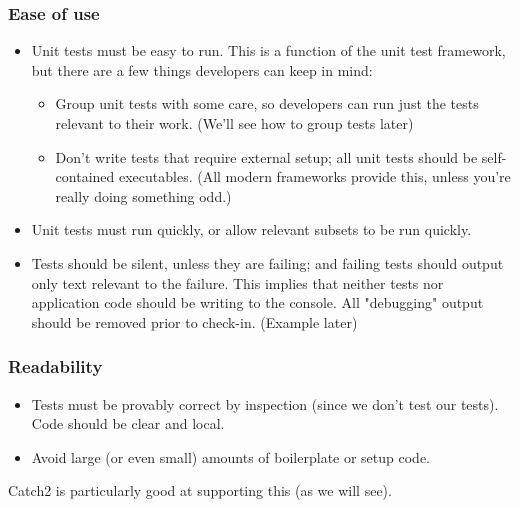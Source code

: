 \begin{frame}[fragile,t]
\frametitle{Ease of use}
\begin{itemize}
\item Unit tests must be easy to run. This is a function of the unit
  test framework, but there are a few things developers can keep in
  mind:
\begin{itemize}
  \item Group unit tests with some care, so developers can run just
    the tests relevant to their work. (We'll see how to group tests
    later)
  \item Don't write tests that require external setup; all unit tests
    should be self-contained executables. (All modern frameworks
    provide this, unless you're really doing something odd.)
\end{itemize}
\item Unit tests must run quickly, or allow relevant subsets to be run quickly.
\item Tests should be silent, unless they are failing; and failing
  tests should output only text relevant to the failure.  This implies
  that neither tests nor application code should be writing to the
  console. All "debugging" output should be removed prior to check-in.
  (Example later)
\end{itemize}
\end{frame}

\begin{frame}[fragile,t]
\frametitle{Readability}
\begin{itemize}
\item Tests must be provably correct by inspection (since we don't test our tests). Code should be clear and local.
\item    Avoid large (or even small) amounts of boilerplate or setup code.
\end{itemize}

Catch2 is particularly good at supporting this (as we will see).

\end{frame}



